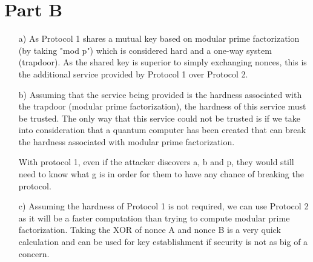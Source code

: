 \documentclass[10pt]{article}
\begin{document}
    \section*{Part B}
    \begin{itemize}
        \item[a)] As Protocol 1 shares a mutual key based on modular prime factorization (by taking "mod p") which is considered hard and a one-way system (trapdoor).  As the shared key is superior to simply exchanging nonces, this is the additional service provided by Protocol 1 over Protocol 2.
        
        \item[b)] Assuming that the service being provided is the hardness associated with the trapdoor (modular prime factorization), the hardness of this service must be trusted.  The only way that this service could not be trusted is if we take into consideration that a quantum computer has been created that can break the hardness associated with modular prime factorization.
        
        With protocol 1, even if the attacker discovers a, b and p, they would still need to know what g is in order for them to have any chance of breaking the protocol.
        
        \item[c)] Assuming the hardness of Protocol 1 is not required, we can use Protocol 2 as it will be a faster computation than trying to compute modular prime factorization.  Taking the XOR of nonce A and nonce B is a very quick calculation and can be used for key establishment if security is not as big of a concern.
        
    \end{itemize} 
\end{document}
